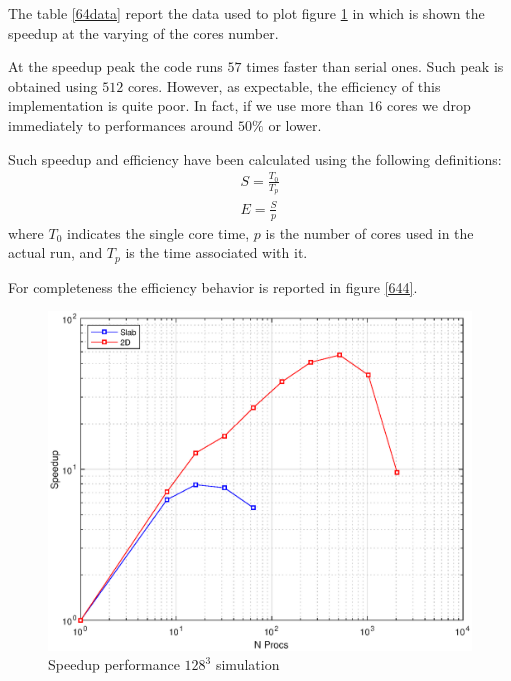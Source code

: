 The table \ref{64data} report the data used to plot figure \ref{642} in which is shown the speedup at the varying of the cores number. \\
\par
At the speedup peak the code runs $57$ times faster than serial ones. Such peak is obtained using $512$ cores. However, as expectable, the efficiency of this implementation is quite poor. In fact, if we use more than $16$ cores we drop immediately to performances around $50\%$ or lower. \\
\par
Such speedup and efficiency have been calculated using the following definitions:
\begin{subequations}
\begin{align}
S = \frac{T_{0}}{T_{p}} \\
E = \frac{S}{p}
\end{align}
\end{subequations}
where $T_{0}$ indicates the single core time, $p$ is the number of cores used in the actual run, and $T_{p}$ is the time associated with it. \\
\par
For completeness the efficiency behavior is reported in figure \ref{644}.

\begin{figure}
\begin{center}
\includegraphics[scale=0.6]{grafici/642}
\caption{Speedup performance $128^3$ simulation}
\label{642}
\end{center}
\end{figure}

